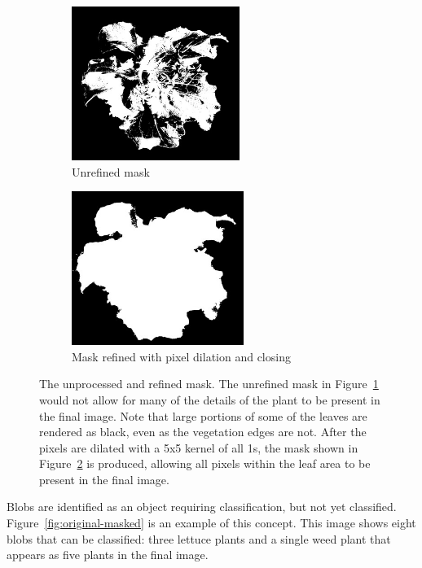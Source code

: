 \documentclass[letterpaper]{article}
\begin{document}
{{\begin{figure}[h!]
	\centering
	\begin{subfigure}[h]{.48\textwidth}
	  \centering
	  \includegraphics[height=5cm]{./figures/mask-raw.jpg}
	  \caption{Unrefined mask}
	  \label{fig:mask-raw}
	\end{subfigure}
	\hfill
	\begin{subfigure}[h]{.48\textwidth}
	  \centering
	  \includegraphics[height=5cm]{./figures/mask-processed.jpg}
	  \caption{Mask refined with pixel dilation and closing}
	  \label{fig:mask-processed}
	\end{subfigure}
	\caption[Mask before and after morphological refinements]{The unprocessed and refined mask. The unrefined mask in Figure~\ref{fig:mask-raw} would not allow for many of the details of the plant to be present in the final image. Note that large portions of some of the leaves are rendered as black, even as the vegetation edges are not. After the pixels are dilated with a 5x5 kernel of all 1s, the mask shown in Figure~\ref{fig:mask-processed} is produced, allowing all pixels within the leaf area to be present in the final image.}
	\label{fig:mask-before-and-after}
\end{figure}


Blobs are identified as an object requiring classification, but not yet classified. Figure~\ref{fig:original-masked} is an example of this concept. This image shows eight blobs that can be classified: three lettuce plants and a single weed plant that appears as five plants in the final image.

}}
\end{document}
